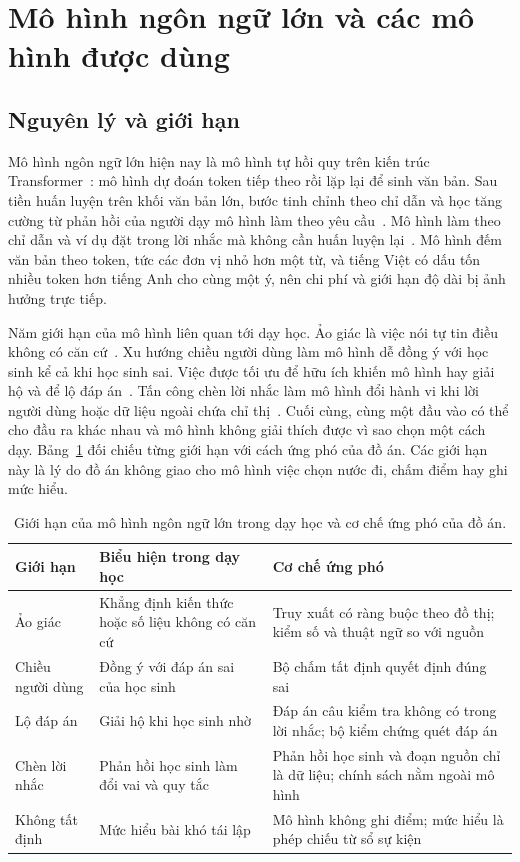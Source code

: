 \section{Mô hình ngôn ngữ lớn và các mô hình được dùng}

\subsection{Nguyên lý và giới hạn}
Mô hình ngôn ngữ lớn hiện nay là mô hình tự hồi quy trên kiến trúc Transformer~\cite{vaswani2017}: mô hình dự đoán token tiếp theo rồi lặp lại để sinh văn bản. Sau tiền huấn luyện trên khối văn bản lớn, bước tinh chỉnh theo chỉ dẫn và học tăng cường từ phản hồi của người dạy mô hình làm theo yêu cầu~\cite{ouyang2022}. Mô hình làm theo chỉ dẫn và ví dụ đặt trong lời nhắc mà không cần huấn luyện lại~\cite{brown2020}. Mô hình đếm văn bản theo token, tức các đơn vị nhỏ hơn một từ, và tiếng Việt có dấu tốn nhiều token hơn tiếng Anh cho cùng một ý, nên chi phí và giới hạn độ dài bị ảnh hưởng trực tiếp.

Năm giới hạn của mô hình liên quan tới dạy học. Ảo giác là việc nói tự tin điều không có căn cứ~\cite{ji2023}. Xu hướng chiều người dùng làm mô hình dễ đồng ý với học sinh kể cả khi học sinh sai. Việc được tối ưu để hữu ích khiến mô hình hay giải hộ và để lộ đáp án~\cite{macina2023}. Tấn công chèn lời nhắc làm mô hình đổi hành vi khi lời người dùng hoặc dữ liệu ngoài chứa chỉ thị~\cite{perez2022,greshake2023}. Cuối cùng, cùng một đầu vào có thể cho đầu ra khác nhau và mô hình không giải thích được vì sao chọn một cách dạy. Bảng~\ref{tab:llm-limits} đối chiếu từng giới hạn với cách ứng phó của đồ án. Các giới hạn này là lý do đồ án không giao cho mô hình việc chọn nước đi, chấm điểm hay ghi mức hiểu.

\begin{table}[H]
\centering
\caption{Giới hạn của mô hình ngôn ngữ lớn trong dạy học và cơ chế ứng phó của đồ án.}
\label{tab:llm-limits}
\small
\begin{tabularx}{\linewidth}{@{}p{2.7cm}XX@{}}
\toprule
Giới hạn & Biểu hiện trong dạy học & Cơ chế ứng phó \\
\midrule
Ảo giác & Khẳng định kiến thức hoặc số liệu không có căn cứ & Truy xuất có ràng buộc theo đồ thị; kiểm số và thuật ngữ so với nguồn \\
Chiều người dùng & Đồng ý với đáp án sai của học sinh & Bộ chấm tất định quyết định đúng sai \\
Lộ đáp án & Giải hộ khi học sinh nhờ & Đáp án câu kiểm tra không có trong lời nhắc; bộ kiểm chứng quét đáp án \\
Chèn lời nhắc & Phản hồi học sinh làm đổi vai và quy tắc & Phản hồi học sinh và đoạn nguồn chỉ là dữ liệu; chính sách nằm ngoài mô hình \\
Không tất định & Mức hiểu bài khó tái lập & Mô hình không ghi điểm; mức hiểu là phép chiếu từ sổ sự kiện \\
\bottomrule
\end{tabularx}
\end{table}


